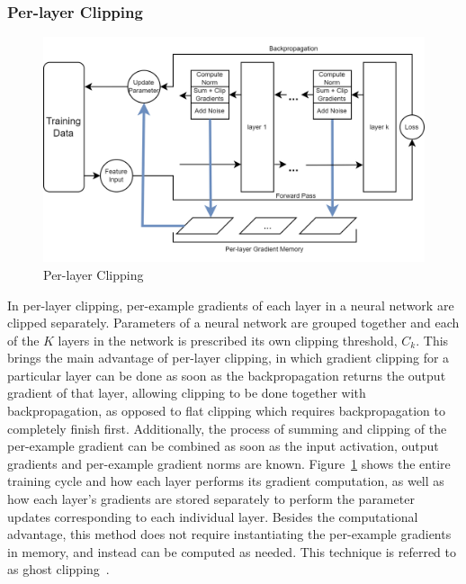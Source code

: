 \subsubsection{Per-layer Clipping}
\begin{figure}[h]
\centering
         \includegraphics[width=1\linewidth]{submissions/submission5/figs/Per Layer Clipping.png}      
   \caption{Per-layer Clipping}\label{FigDiff}
   \label{perlayerclipping}
\end{figure} 
In per-layer clipping, per-example gradients of each layer in a neural network are clipped separately. Parameters of a neural network are grouped together and each of the $K$ layers in the network is prescribed its own clipping threshold, $C_k$. This brings the main advantage of per-layer clipping, in which gradient clipping for a particular layer can be done as soon as the backpropagation returns the output gradient of that layer, allowing clipping to be done together with backpropagation, as opposed to flat clipping which requires backpropagation to completely finish first. Additionally, the process of summing and clipping of the per-example gradient can be combined as soon as the input activation, output gradients and per-example gradient norms are known. Figure~\ref{perlayerclipping} shows the entire training cycle and how each layer performs its gradient computation, as well as how each layer's gradients are stored separately to perform the parameter updates corresponding to each individual layer. Besides the computational advantage, this method does not require instantiating the per-example gradients in memory, and instead can be computed as needed. This technique is referred to as ghost clipping~\cite{RefWorks:RefID:44-li2022large}. 

